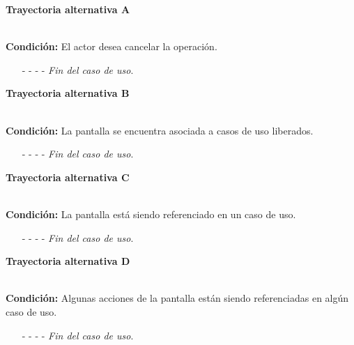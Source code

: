 \hypertarget{CU11-3:TAA}{\textbf{Trayectoria alternativa A}}\\
\noindent \textbf{Condición:} El actor desea cancelar la operación.
\begin{enumerate}
	\UCpaso[\UCactor] Oprime el botón  de la pantalla emergente.
	\UCpaso[\UCsist] Muestra la pantalla .
	\item[- -] - - {\em {Fin del caso de uso}}.%
\end{enumerate}		
\hypertarget{CU11-3:TAB}{\textbf{Trayectoria alternativa B}}\\
\noindent \textbf{Condición:} La pantalla se encuentra asociada a casos de uso liberados.
\begin{enumerate}
	\UCpaso[\UCsist] Oculta el botón \eliminar de la pantalla que esta asociada a casos de uso liberados.
	\item[- -] - - {\em {Fin del caso de uso}}.
\end{enumerate}
\hypertarget{CU11-3:TAC}{\textbf{Trayectoria alternativa C}}\\
\noindent \textbf{Condición:} La pantalla está siendo referenciado en un caso de uso.
\begin{enumerate}
	\UCpaso[\UCsist] Muestra el mensaje  en la pantalla  en una pantalla emergente con la lista de casos de uso que están referenciando a la pantalla.
	\item[- -] - - {\em {Fin del caso de uso}}.
\end{enumerate}
\hypertarget{CU11-3:TAD}{\textbf{Trayectoria alternativa D}}\\
\noindent \textbf{Condición:} Algunas acciones de la pantalla están siendo referenciadas en algún caso de uso.
\begin{enumerate}
	\UCpaso[\UCsist] Muestra el mensaje  en la pantalla  en una pantalla emergente con la lista de elementos que están referenciando a la acción de la pantalla.
	\item[- -] - - {\em {Fin del caso de uso}}.
\end{enumerate}
	

